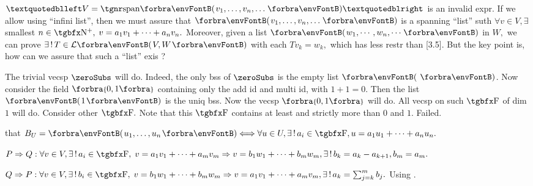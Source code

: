 \vfill{}

\vspace{4pt}

\BulletPointX{}\;\;$“V=\Span{v_1,\dots,v_n,\dots}”$ is an invalid expr.\TextB{}
If we allow using $“$infini list$”$, then we must assure that $\Par{v_1,\dots,v_n,\dots}$ is a spanning $“$list$”$\TextB{}
suth $\forall v\in V,\exists$ smallest $n\in\Nbp,\;v=a_1 v_1+\dots+a_n v_n.$ Moreover, given a list $\Par{w_1,\cdots,w_n,\cdots}$ in $W,$\TextB{}
we can prove $\exists\,!\,T\in\Lm{V,W}$ with each $Tv_k=w_k,$ which has less restr than [3.5].\TextB{}
But the key point is, how can we assure that such a $“$list$”$ exis ? 
\SepLine

The trivial vecsp $\zeroSubs$ will do. Indeed, the only bss of $\zeroSubs$ is the empty list $\Par{\,}$.\parSol{}
Now consider the field $\Bra{0,1}$ containing only the add id and multi id,\parSol{}
with $1+1=0.$ Then the list $\Par{1}$ is the uniq bss. Now the vecsp $\Bra{0,1}$ will do.\parSol{}
\AComm All vecsp on such $\Fbb$ of dim $1$ will do.\parSol{}
Consider other $\Fbb.$ Note that this $\Fbb$ contains at least and strictly more than $0$ and $1.$ Failed.\PfEnd
\SepLine\pagebreak


\NOTICE that $B_U=\Par{u_1,\dots,u_n}\Longleftrightarrow\forall u\in U,\exists\,!\,a_i\in\Fbb,u=a_1 u_1+\dots+a_n u_n.$\par\quad
$P\Rightarrow Q:\forall v\in V,\exists\,!\,a_i\in\Fbb,\;v=a_1 v_1+\dots+a_m v_m\Rightarrow v=b_1 w_1+\dots+b_m w_m,\exists\,!\,b_k=a_k-a_{k+1},b_m=a_m.$\vspace{2pt}\par\quad
$Q\Rightarrow P:\forall v\in V,\exists\,!\,b_i\in\Fbb,\;v=b_1w_1+\dots+b_mw_m\Rightarrow v=a_1v_1+\dots+a_mv_m,\exists\,!\,a_k=\sum_{j=k}^m b_j.$\PfEnd\vspace{3pt}
\AComm \Or Using .
\SepLine

